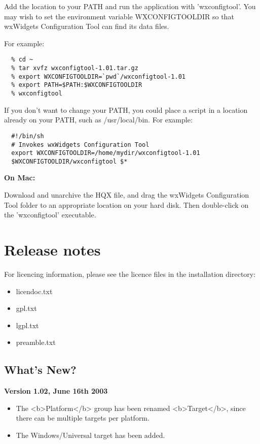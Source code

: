 Add the location to your PATH and run the application with
'wxconfigtool'. You may wish to set the environment variable
WXCONFIGTOOLDIR so that wxWidgets Configuration Tool can find its data files.

For example:

\begin{verbatim}
  % cd ~
  % tar xvfz wxconfigtool-1.01.tar.gz
  % export WXCONFIGTOOLDIR=`pwd`/wxconfigtool-1.01
  % export PATH=$PATH:$WXCONFIGTOOLDIR
  % wxconfigtool
\end{verbatim}

If you don't want to change your PATH, you could place a
script in a location already on your PATH, such as
/usr/local/bin. For example:

\begin{verbatim}
  #!/bin/sh
  # Invokes wxWidgets Configuration Tool
  export WXCONFIGTOOLDIR=/home/mydir/wxconfigtool-1.01
  $WXCONFIGTOOLDIR/wxconfigtool $*
\end{verbatim}

{\bf On Mac:}

Download and unarchive the HQX file, and drag the wxWidgets Configuration Tool folder to an appropriate location
on your hard disk. Then double-click on the 'wxconfigtool' executable.

\chapter{Release notes}\label{releasenotes}%
%
\setfooter{\thepage}{}{}{}{}{\thepage}%

For licencing information, please see
the licence files in the installation directory:

\begin{itemize}\itemsep=0pt
\item licendoc.txt
\item gpl.txt
\item lgpl.txt
\item preamble.txt
\end{itemize}

\section{What's New?}\label{whatsnew}

{\bf Version 1.02, June 16th 2003}

\begin{itemize}\itemsep=10pt
\item The <b>Platform</b> group has been renamed
<b>Target</b>, since there can be multiple targets
per platform.
\item The Windows/Universal target has been added.
\end{itemize}

